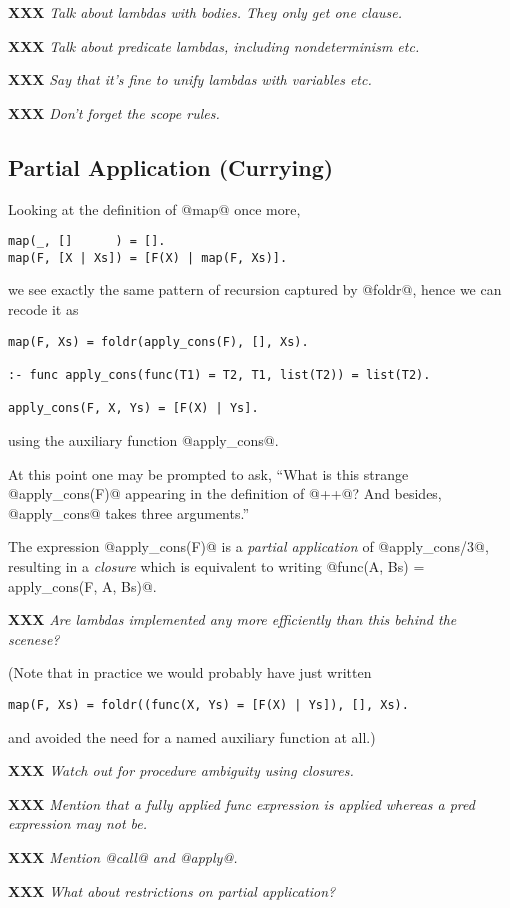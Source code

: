 \documentclass[a4paper,11pt,notitlepage,onecolumn]{article}
\newcommand{\XXX}[1]%
{{\small\textbf{XXX} \emph{#1}}}
\begin{document}
\XXX{Talk about lambdas with bodies.  They only get one clause.}

\XXX{Talk about predicate lambdas, including nondeterminism etc.}

\XXX{Say that it's fine to unify lambdas with variables etc.}

\XXX{Don't forget the scope rules.}

\subsection{Partial Application (Currying)}

Looking at the definition of @map@ once more,
\begin{verbatim}
map(_, []      ) = [].
map(F, [X | Xs]) = [F(X) | map(F, Xs)].
\end{verbatim}
we see exactly the same pattern of recursion captured by @foldr@, hence
we can recode it as
\begin{verbatim}
map(F, Xs) = foldr(apply_cons(F), [], Xs).

:- func apply_cons(func(T1) = T2, T1, list(T2)) = list(T2).

apply_cons(F, X, Ys) = [F(X) | Ys].
\end{verbatim}
using the auxiliary function @apply_cons@.  

At this point one may be prompted to ask, ``What is this strange
@apply_cons(F)@ appearing in the definition of @++@?  And besides,
@apply_cons@ takes three arguments.''

The expression @apply_cons(F)@ is a \emph{partial application} of
@apply_cons/3@, resulting in a \emph{closure} which is equivalent to
writing @func(A, Bs) = apply_cons(F, A, Bs)@.

\XXX{Are lambdas implemented any more efficiently than this behind the
scenese?}

(Note that in practice we would probably have just written
\begin{verbatim}
map(F, Xs) = foldr((func(X, Ys) = [F(X) | Ys]), [], Xs).
\end{verbatim}
and avoided the need for a named auxiliary function at all.)

\XXX{Watch out for procedure ambiguity using closures.}

\XXX{Mention that a fully applied func expression is applied whereas a
pred expression may not be.}

\XXX{Mention @call@ and @apply@.}

\XXX{What about restrictions on partial application?}
\end{document}
